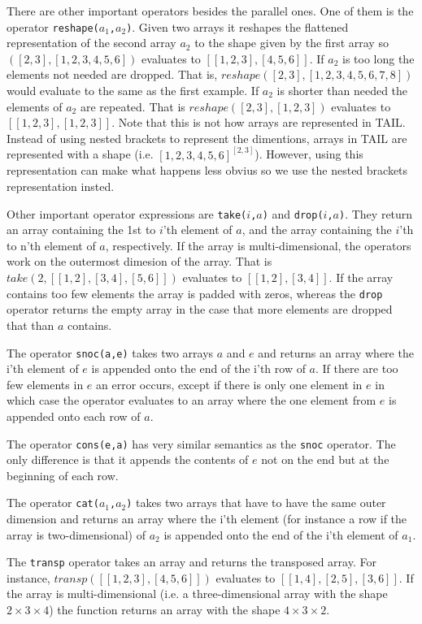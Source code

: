 \documentclass[11pt]{article}
\begin{document}
There are other important operators besides the parallel ones. One of them is the operator {\tt reshape($a_1$,$a_2$)}.
Given two arrays it reshapes the flattened representation of the second array $a_2$ to the shape given by the first array so $([2,3],[1,2,3,4,5,6])$ evaluates to $[[1,2,3],[4,5,6]]$. 
If $a_2$ is too long the elements not needed are dropped. That is, $reshape([2,3],[1,2,3,4,5,6,7,8])$ would evaluate to the same as the first example.
If $a_2$ is shorter than needed the elements of $a_2$ are repeated. That is $reshape([2,3],[1,2,3])$ evaluates to $[[1,2,3],[1,2,3]]$. Note that this is not how arrays are represented in TAIL. Instead of using nested brackets to represent the dimentions, arrays in TAIL are represented with a shape (i.e. $[1,2,3,4,5,6]^{[2,3]}$). However, using this representation can make what happens less obvius so we use the nested brackets representation insted. 

Other important operator expressions are {\tt take($i$,$a$)} and {\tt drop($i$,$a$)}.
They return an array containing the 1st to $i$'th element of $a$,
and the array containing the $i$'th to n'th element of $a$, respectively.
If the array is multi-dimensional, the operators work on the outermost dimesion of the array. That is $take(2,[[1,2],[3,4],[5,6]])$ evaluates to $[[1,2],[3,4]]$.
If the array contains too few elements the array is padded with zeros,
whereas the {\tt drop} operator returns the empty array in the case that more elements are dropped that than $a$ contains. 

The operator {\tt snoc(a,e)} takes two arrays $a$ and $e$ and returns an array where the i'th element of $e$ is appended onto the end of the i'th row of $a$.
If there are too few elements in $e$ an error occurs,
except if there is only one element in $e$ in which case the operator evaluates to an array where the one element from $e$
is appended onto each row of $a$.

The operator {\tt cons(e,a)} has very similar semantics as the {\tt snoc} operator.
The only difference is that it appends the contents of $e$ not on the end but at the beginning of each row.

The operator {\tt cat($a_1$,$a_2$)} takes two arrays that have to have the same outer dimension and returns an array where the i'th element (for instance a row if the array is two-dimensional) of $a_2$ is appended onto the end of the i'th element of $a_1$.

The {\tt transp} operator takes an array and returns the transposed array. For instance,
 $transp([[1,2,3],[4,5,6]])$ evaluates to $[[1,4],[2,5],[3,6]]$.
If the array is multi-dimensional (i.e. a three-dimensional array with the shape $2\times3\times4$) the function returns an array with the shape $4\times3\times2$.
\end{document}
